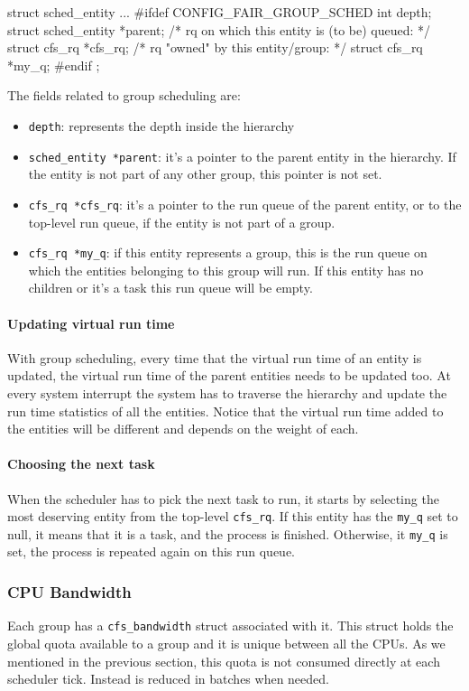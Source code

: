 \begin{code}
struct sched_entity {
...
#ifdef CONFIG_FAIR_GROUP_SCHED
	int				depth;
	struct sched_entity		*parent;
	/* rq on which this entity is (to be) queued: */
	struct cfs_rq			*cfs_rq;
	/* rq "owned" by this entity/group: */
	struct cfs_rq			*my_q;
#endif
};
\end{code}
The fields related to group scheduling are:
\begin{itemize}
    \item \verb|depth|: represents the depth inside the hierarchy
    \item \verb|sched_entity *parent|: it's a pointer to the parent entity in the hierarchy. If the entity is not part of any other group, this pointer is not set.
    \item \verb|cfs_rq *cfs_rq|: it's a  pointer to the run queue of the parent entity, or to the top-level run queue, if the entity is not part of a group.
    \item \verb|cfs_rq *my_q|: if this entity represents a group, this is the run queue on which the entities belonging to this group will run. If this entity has no children or it's a task this run queue will be empty.
\end{itemize}

\paragraph{Updating virtual run time}
With group scheduling, every time that the virtual run time of an entity is updated, the virtual run time of the parent entities needs to be updated too. At every system interrupt the system has to traverse the hierarchy and update the run time statistics of all the entities. Notice that the virtual run time added to the entities will be different and depends on the weight of each.

\paragraph{Choosing the next task}
When the scheduler has to pick the next task to run, it starts by selecting the most deserving entity from the top-level \verb|cfs_rq|. If this entity has the \verb|my_q| set to null, it means that it is a task, and the process is finished. Otherwise, it \verb|my_q| is set, the process is repeated again on this run queue.

\subsubsection{CPU Bandwidth}
Each group has a \verb|cfs_bandwidth| struct associated with it. This struct holds the global quota available to a group and it is unique between all the CPUs. As we mentioned in the previous section, this quota is not consumed directly at each scheduler tick. Instead is reduced in batches when needed.

